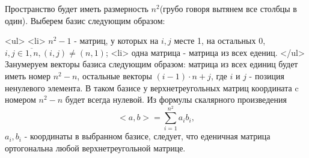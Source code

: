 Пространство будет иметь размерность $n^2$(грубо говоря вытянем все столбцы в один).
Выберем базис следующим образом:

<ul>
<li> $n^2-1$ - матриц, у которых на $i,j$ месте
1, на остальных 0, $i,j \in \overline{1,n}, (i,j)\neq(n,1)$;
<li> одна матрица - матрица из всех едениц.
</ul>
Занумеруем векторы базиса следующим образом: матрица из всех единиц будет иметь
номер $n^2-n$, остальные векторы $(i-1)\cdot n+j$, где $i$ и $j$ - позиция ненулевого
элемента.
В таком базисе у верхнетреугольных матриц координата c номером $n^2-n$ будет
всегда нулевой. Из формулы скалярного произведения $$<a,b>=\sum_{i=1}^{n^2}a_ib_i,$$
$a_i,b_i$ - координаты в выбранном базисе, следует, что еденичная матрица
 ортогональна любой верхнетреугольной матрице.
